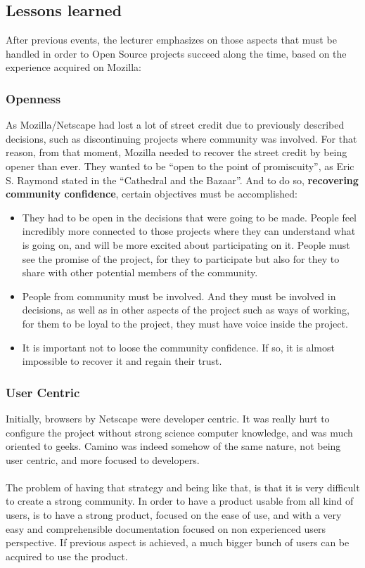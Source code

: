 \documentclass[11pt]{article}
\begin{document}
\subsection{Lessons learned}
After previous events, the lecturer emphasizes on those aspects that must be handled in order to Open Source projects succeed along the time, based on the experience acquired on Mozilla:
\subsubsection{Openness}
As Mozilla/Netscape had lost a lot of street credit due to previously described decisions, such as discontinuing projects where community was involved. For that reason, from that moment, Mozilla needed to recover the street credit by being opener than ever. They wanted to be ``open to the point of promiscuity'', as Eric S. Raymond stated in the ``Cathedral and the Bazaar''. And to do so, \textbf{recovering community confidence}, certain objectives must be accomplished:
\begin{itemize}\itemsep0pt
\item{They had to be open in the decisions that were going to be made}. People feel incredibly more connected to those projects where they can understand what is going on, and will be more excited about participating on it. People must see the promise of the project, for they to participate but also for they to share with other potential members of the community.
\item{People from community must be involved}. And they must be involved in decisions, as well as in other aspects of the project such as ways of working, for them to be loyal to the project, they must have voice inside the project.
\item{It is important not to loose the community confidence}. If so, it is almost impossible to recover it and regain their trust.
\end{itemize}

\subsubsection{User Centric}
Initially, browsers by Netscape were developer centric. It was really hurt to configure the project without strong science computer knowledge, and was much oriented to geeks. 
Camino was indeed somehow of the same nature, not being user centric, and more focused to developers.\\
\\
The problem of having that strategy and being like that, is that it is very difficult to create a strong community. In order to have a product usable from all kind of users, is to have a strong product, focused on the ease of use, and with a very easy and comprehensible documentation focused on non experienced users perspective. If previous aspect is achieved, a much bigger bunch of users can be acquired to use the product.
\end{document}

